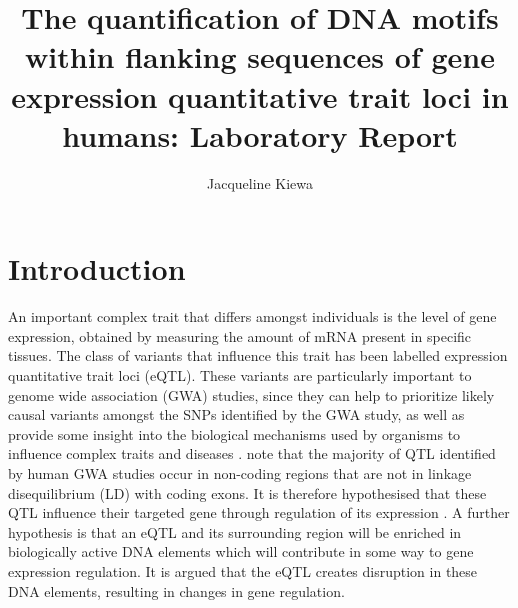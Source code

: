 \documentclass[12pt]{article}
\begin{document}


\title{The quantification of DNA motifs within flanking sequences of gene expression quantitative trait loci in humans: Laboratory Report}


\author{Jacqueline Kiewa}





\doublespacing
\maketitle
\clearpage
\tableofcontents


\clearpage
\section{Introduction}

An important complex trait that differs amongst individuals is the level of gene expression, obtained by measuring the amount of mRNA present in specific tissues. The class of variants that influence this trait has been labelled expression quantitative trait loci (eQTL). These variants are particularly important to genome wide association (GWA) studies, since they can help to prioritize likely causal variants amongst the SNPs identified by the GWA study, as well as provide some insight into the biological mechanisms used by organisms to influence complex traits and diseases \citep{albert2015role}. \citet{albert2015role} note that the majority of QTL identified by human GWA studies occur in non-coding regions that are not in linkage disequilibrium (LD) with coding exons. It is therefore hypothesised that these QTL influence their targeted gene through regulation of its expression \citep{nica2013expression}. A further hypothesis is that an eQTL and its surrounding region will be enriched in biologically active DNA elements which will contribute in some way to gene expression regulation. It is argued that the eQTL creates disruption in these DNA elements, resulting in changes in gene regulation. 
\end{document}
